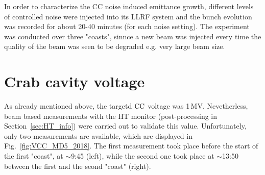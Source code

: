 In order to characterize the CC noise induced emittance growth, different levels of controlled noise were injected into its LLRF system and the bunch evolution was recorded for about 20-40 minutes (for each noise setting). The experiment was conducted over three "coasts", sinnce a new beam was injected every time the quality of the beam was seen to be degraded e.g. very large beam size.


\section{Crab cavity voltage}\label{sec:CC_voltage_meas2018}

As already mentioned above, the targetd ${\mathrm{CC}}$ voltage was 1\,MV. Nevetherless, beam based measurements with the HT monitor (post-processing in Section~\ref{sec:HT_info}) were carried out to validate this value. Unfortunately, only two measurements are available, which are displayed in Fig.~\ref{fig:VCC_MD5_2018}. The first measurement took place before the start of the first "coast", at $\sim$9:45 (left), while the second one took place at $\sim$13:50 between the first and the seond "coast" (right). 


